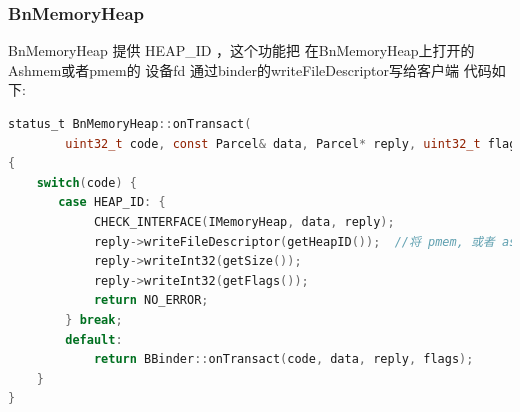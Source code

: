 \documentclass[a4paper,11pt]{article}
\begin{document}
\subsubsection{BnMemoryHeap}
  BnMemoryHeap  提供  HEAP_ID ，这个功能把 在BnMemoryHeap上打开的 Ashmem或者pmem的 设备fd 通过binder的writeFileDescriptor写给客户端
代码如下:
\begin{lstlisting}[language=c]
status_t BnMemoryHeap::onTransact(
        uint32_t code, const Parcel& data, Parcel* reply, uint32_t flags)
{
    switch(code) {
       case HEAP_ID: {
            CHECK_INTERFACE(IMemoryHeap, data, reply);
            reply->writeFileDescriptor(getHeapID());  //将 pmem, 或者 ashmem 的 fd 写给客户端
            reply->writeInt32(getSize());
            reply->writeInt32(getFlags());
            return NO_ERROR;
        } break;
        default:
            return BBinder::onTransact(code, data, reply, flags);
    }
}
\end{lstlisting}
 
\end{document}
